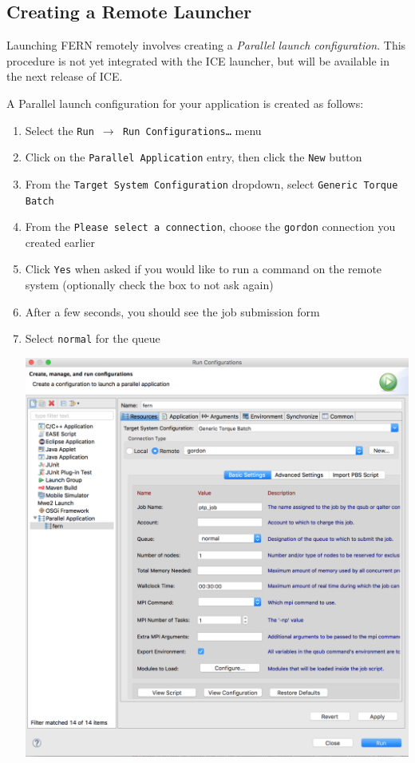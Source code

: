 \subsection{Creating a Remote Launcher}

Launching FERN remotely involves creating a \textit{Parallel launch
configuration}.
This procedure is not yet integrated with the ICE launcher, but will be
available in the next release of ICE.

A Parallel launch configuration for your application is created as follows:

\begin{enumerate}
  \item Select the \texttt{Run $\rightarrow$ Run Configurations\ldots} menu
  \item Click on the \texttt{Parallel Application} entry, then click the
  \texttt{New} button
  \item From the \texttt{Target System Configuration} dropdown, select
  \texttt{Generic Torque Batch}
  \item From the \texttt{Please select a connection}, choose the \texttt{gordon}
  connection you created earlier
  \item Click \texttt{Yes} when asked if you would like to run a command on the
  remote system (optionally check the box to not ask again)
  \item After a few seconds, you should see the job submission form
  \item Select \texttt{normal} for the queue
  
  \begin{center} \includegraphics[width=\textwidth]{figures/runConfiguration}
  \end{center}
  

\end{enumerate}
